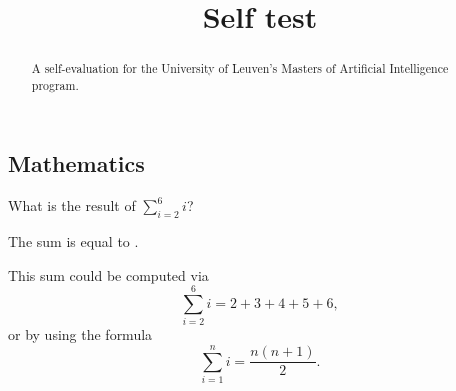 \documentclass{ximera}
\title{Self test}
\begin{document}
\begin{abstract}
A self-evaluation for the University of Leuven's Masters of Artificial
Intelligence program.
\end{abstract}
\maketitle

\subsection*{Mathematics}

\begin{question}
What is the result of $\sum_{i=2}^6 i$?
\begin{solution}
The sum is equal to .
\end{solution}
This sum could be computed via
\[
\sum_{i=2}^6 i = 2 + 3 + 4 + 5 + 6,
\]
or by using the formula
\[
\sum_{i=1}^n i = \frac{n(n+1)}{2}.
\]
\end{question}
\end{document}
